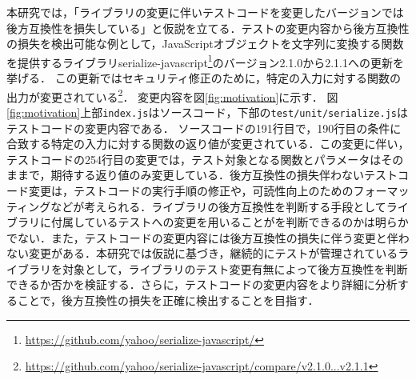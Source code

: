 \documentclass[submit]{ipsj}
\begin{document}

本研究では，「ライブラリの変更に伴いテストコードを変更したバージョンでは後方互換性を損失している」と仮説を立てる．テストの変更内容から後方互換性の損失を検出可能な例として，JavaScriptオブジェクトを文字列に変換する関数を提供するライブラリserialize-javascript\footnote{\url{https://github.com/yahoo/serialize-javascript/}}のバージョン2.1.0から2.1.1への更新を挙げる．
この更新ではセキュリティ修正のために，特定の入力に対する関数の出力が変更されている\footnote{\url{https://github.com/yahoo/serialize-javascript/compare/v2.1.0...v2.1.1}}．
変更内容を図\ref{fig:motivation}に示す．
図\ref{fig:motivation}上部{\verb|index.js|}はソースコード，下部の{\verb|test/unit/serialize.js|}はテストコードの変更内容である．
ソースコードの191行目で，190行目の条件に合致する特定の入力に対する関数の返り値が変更されている．この変更に伴い，テストコードの254行目の変更では，テスト対象となる関数とパラメータはそのままで，期待する返り値のみ変更している．\textcolor{red}{}後方互換性の損失\textcolor{red}{}伴わないテストコード変更は，テストコードの実行手順の修正や，可読性向上のためのフォーマッティングなどが考えられる．ライブラリの後方互換性を判断する手段としてライブラリに付属しているテストへの変更を用いることが\textcolor{red}{}を判断できるのかは明らかでない．また，テストコードの変更内容には後方互換性の損失に伴う変更と伴わない変更がある．本研究では仮説に基づき，継続的にテストが管理されているライブラリを対象として，ライブラリのテスト変更有無によって後方互換性を判断できるか否かを検証する．さらに，テストコードの変更内容をより詳細に分析することで，後方互換性の損失を正確に検出することを目指す．
\end{document}
